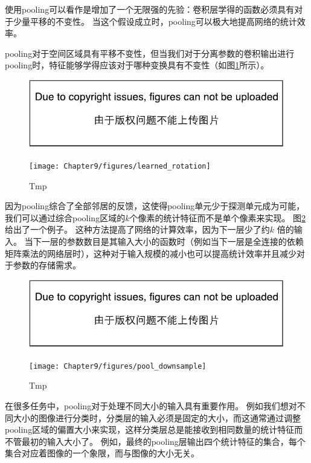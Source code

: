  
使用\gls{pooling}可以看作是增加了一个无限强的先验：卷积层学得的函数必须具有对于少量平移的不变性。
当这个假设成立时，\gls{pooling}可以极大地提高网络的统计效率。

\gls{pooling}对于空间区域具有平移不变性，但当我们对于分离参数的卷积输出进行\gls{pooling}时，特征能够学得应该对于哪种变换具有不变性（如图\ref{fig:chap9_learned_rotation}所示）。
\begin{figure}[!htb]
\ifOpenSource
\centerline{\includegraphics{figure.pdf}}
\else
\centerline{\texttt{[image: Chapter9/figures/learned\_rotation]}}
\fi
\caption{Tmp}
\label{fig:chap9_learned_rotation}
\end{figure}

 
因为\gls{pooling}综合了全部邻居的反馈，这使得\gls{pooling}单元少于探测单元成为可能，我们可以通过综合\gls{pooling}区域的$k$个像素的统计特征而不是单个像素来实现。
图\ref{fig:chap9_pool_downsample}给出了一个例子。
这种方法提高了网络的计算效率，因为下一层少了约$k$ 倍的输入。
当下一层的参数数目是其输入大小的函数时（例如当下一层是全连接的依赖矩阵乘法的网络层时），这种对于输入规模的减小也可以提高统计效率并且减少对于参数的存储需求。
\begin{figure}[!htb]
\ifOpenSource
\centerline{\includegraphics{figure.pdf}}
\else
\centerline{\texttt{[image: Chapter9/figures/pool\_downsample]}}
\fi
\caption{Tmp}
\label{fig:chap9_pool_downsample}
\end{figure}

 
在很多任务中，\gls{pooling}对于处理不同大小的输入具有重要作用。
例如我们想对不同大小的图像进行分类时，分类层的输入必须是固定的大小，而这通常通过调整\gls{pooling}区域的偏置大小来实现，这样分类层总是能接收到相同数量的统计特征而不管最初的输入大小了。
例如，最终的\gls{pooling}层输出四个统计特征的集合，每个集合对应着图像的一个象限，而与图像的大小无关。

